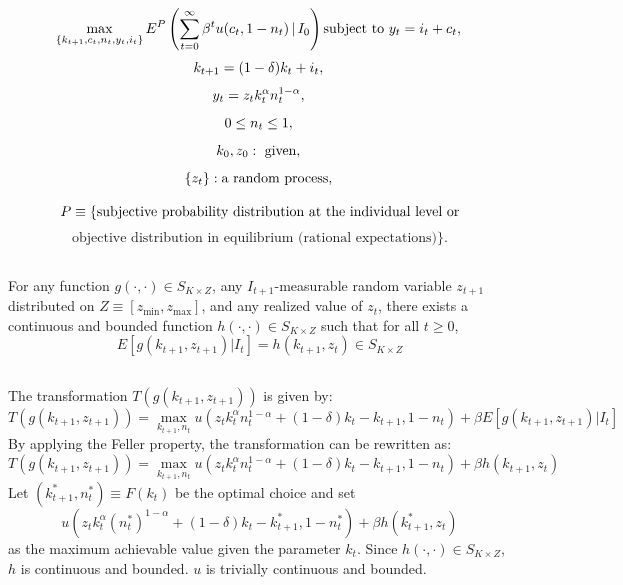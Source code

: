 \documentclass{article}
\begin{document}
\[
\max_{\{k_{t+1}, c_t, n_t, y_t, i_t\}} E^P \left( \sum_{t=0}^{\infty} \beta^{t} u(c_t, 1 - n_t) \,|\, I_0 \right) \text{subject to } y_t = i_t + c_t,\\
\]
\[
k_{t+1} = (1 - \delta) k_t + i_t,\\
\]
\[
y_t = z_t k_t^\alpha n_t^{1 - \alpha},\\
\]
\[
0 \leq n_t \leq 1,\\
\]
\[
k_0, z_0: \text{ given},\\
\]
\[
\{ z_t \}: \text{a random process},\\
\]

\[
P \equiv \text{\{subjective probability distribution at the individual level or} \\
\]
\[
\text{objective distribution in equilibrium (rational expectations)\}}.
\]

\subsection{}
For any function $g(\cdot, \cdot) \in S_{K \times Z}$, any $I_{t+1}$-measurable random variable $z_{t+1}$ distributed on $Z \equiv [z_{\text{min}}, z_{\text{max}}]$, and any realized value of $z_t$, there exists a continuous and bounded function $h(\cdot, \cdot) \in S_{K \times Z}$ such that for all $t \geq 0$, 
\begin{equation}
    E[g(k_{t+1},z_{t+1})|I_t] = h(k_{t+1}, z_t) \in S_{K \times Z}
\end{equation}

\subsection{}
The transformation $T(g(k_{t+1},z_{t+1}))$ is given by:
\begin{equation}
    T(g(k_{t+1},z_{t+1})) = \max_{k_{t+1},n_t} u\left(z_t k_t^\alpha n_t^{1-\alpha} + (1-\delta) k_t - k_{t+1}, 1 - n_t\right) + \beta E[g(k_{t+1},z_{t+1})|I_t]
\end{equation}
By applying the Feller property, the transformation can be rewritten as:
\begin{equation}
    T(g(k_{t+1},z_{t+1})) = \max_{k_{t+1},n_t} u\left(z_t k_t^\alpha n_t^{1-\alpha} + (1-\delta) k_t - k_{t+1}, 1 - n_t\right) + \beta h(k_{t+1},z_{t})
\end{equation}
Let $(k^*_{t+1},n^*_t) \equiv F(k_t)$ be the optimal choice and set
\begin{equation}
    u\left(z_t k_t^\alpha (n^*_t)^{1-\alpha} + (1-\delta) k_t - k^*_{t+1}, 1 - n^*_t\right) + \beta h(k^*_{t+1},z_{t})
\end{equation}
as the maximum achievable value given the parameter $k_t$. Since $h(\cdot, \cdot) \in S_{K \times Z}$, $h$ is continuous and bounded. $u$ is trivially continuous and bounded.
\end{document}
